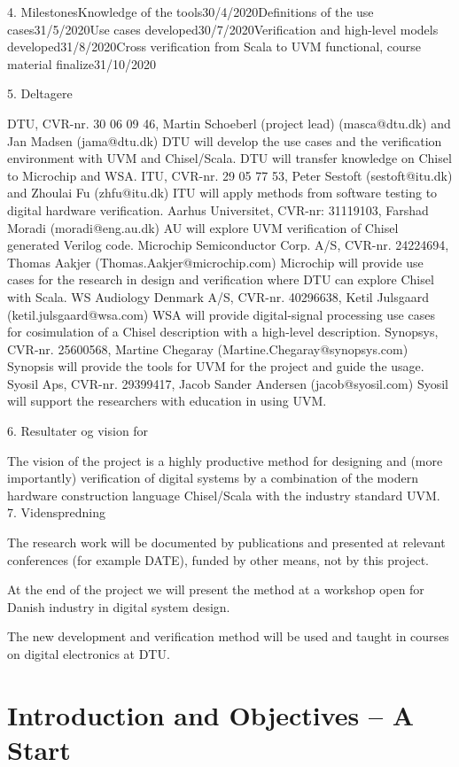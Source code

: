 \documentclass[fleqn,12pt]{article}
\begin{document}
4. MilestonesKnowledge of the tools30/4/2020Definitions of the use cases31/5/2020Use cases developed30/7/2020Verification and high-level models developed31/8/2020Cross verification from Scala to UVM functional, course material finalize31/10/2020

5. Deltagere



DTU, CVR-nr. 30 06 09 46, Martin Schoeberl (project lead) (masca@dtu.dk) and Jan Madsen (jama@dtu.dk)
DTU will develop the use cases and the verification environment with UVM and Chisel/Scala. DTU will transfer knowledge on Chisel to Microchip and WSA.
ITU, CVR-nr. 29 05 77 53, Peter Sestoft (sestoft@itu.dk) and Zhoulai Fu (zhfu@itu.dk)
ITU will apply methods from software testing to digital hardware verification.
Aarhus Universitet, CVR-nr: 31119103, Farshad Moradi (moradi@eng.au.dk)
AU will explore UVM verification of Chisel generated Verilog code.
Microchip Semiconductor Corp. A/S, CVR-nr. 24224694, Thomas Aakjer (Thomas.Aakjer@microchip.com)
Microchip will provide use cases for the research in design and verification where DTU can explore Chisel with Scala.
WS Audiology Denmark A/S, CVR-nr. 40296638, Ketil Julsgaard (ketil.julsgaard@wsa.com)
WSA will provide digital-signal processing use cases for cosimulation of a Chisel description with a high-level description.
Synopsys, CVR-nr. 25600568, Martine Chegaray (Martine.Chegaray@synopsys.com)
Synopsis will provide the tools for UVM for the project and guide the usage.
Syosil Aps, CVR-nr. 29399417, Jacob Sander Andersen (jacob@syosil.com)
Syosil will support the researchers with education in using UVM.


6. Resultater og vision for 

The vision of the project is a highly productive method for designing and (more importantly) verification of digital systems by a combination of the modern hardware construction language Chisel/Scala with the industry standard UVM.
7. Videnspredning

The research work will be documented by publications and presented at relevant conferences (for example DATE), funded by other means, not by this project.

At the end of the project we will present the method at a workshop open for Danish industry in digital system design.

The new development and verification method will be used and taught in courses on digital electronics at DTU.\newpage

\section{Introduction and Objectives -- A Start}
\label{sec:objectives}
\end{document}
